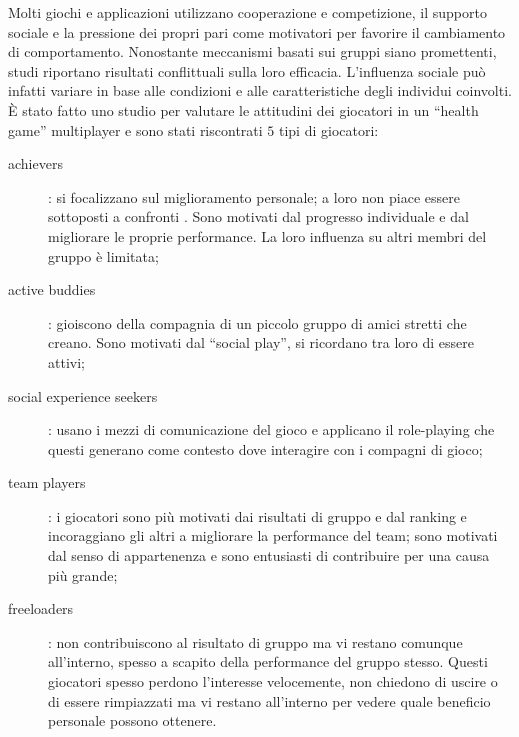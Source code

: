 Molti giochi e applicazioni utilizzano cooperazione e competizione, il supporto sociale e la pressione dei propri pari come motivatori per favorire il cambiamento di comportamento.
Nonostante meccanismi basati sui gruppi siano promettenti, studi riportano risultati conflittuali sulla loro efficacia. L'influenza sociale può infatti variare in base alle condizioni e alle caratteristiche degli individui coinvolti. È stato fatto uno studio per valutare le attitudini dei giocatori in un ``health game'' multiplayer e sono stati riscontrati $5$ tipi di giocatori:
\begin{description}
    \item[achievers]: si focalizzano sul miglioramento personale; a loro non piace essere sottoposti a confronti . Sono motivati dal progresso individuale e dal migliorare le proprie performance. La loro influenza su altri membri del gruppo è limitata;
    \item[active buddies]: gioiscono della compagnia di un piccolo gruppo di amici stretti che creano. Sono motivati dal ``social play'', si ricordano tra loro di essere attivi;
    \item[social experience seekers]: usano i mezzi di comunicazione del gioco e applicano il role-playing che questi generano come contesto dove interagire con i compagni di gioco;
    \item[team players]: i giocatori sono più motivati dai risultati di gruppo e dal ranking e incoraggiano gli altri a migliorare la performance del team; sono motivati dal senso di appartenenza e sono entusiasti di contribuire per una causa più grande;
    \item[freeloaders]: non contribuiscono al risultato di gruppo ma vi restano comunque all'interno, spesso a scapito della performance del gruppo stesso. Questi giocatori spesso perdono l'interesse velocemente, non chiedono di uscire o di essere rimpiazzati ma vi restano all'interno per vedere quale beneficio personale possono ottenere. 
\end{description}

